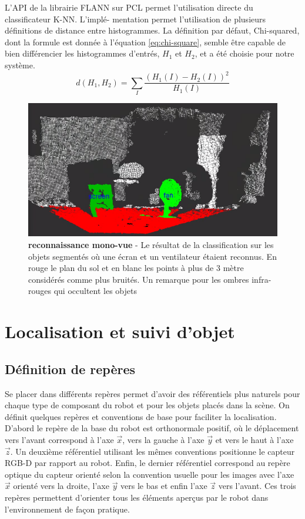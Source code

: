 L'API de la librairie FLANN sur PCL permet l'utilisation directe du classificateur K-NN. L'implé- mentation permet l'utilisation de plusieurs définitions de distance entre histogrammes. La définition par défaut, Chi-squared, dont la formule est donnée à l'équation \ref{eq:chi-square}, semble être capable de bien différencier les histogrammes d'entrés, $H_1$ et $H_2$, et a été choisie pour notre système.
\begin{equation}
d(H_1, H_2) = \sum _I \frac{\left(H_1(I)-H_2(I)\right)^2}{H_1(I)}
\label{eq:chi-square}
\end{equation}

\begin{figure}[H]
	\includegraphics[width=\textwidth]{mono_recon.png}
	\caption{\textbf{reconnaissance mono-vue} - Le résultat de la classification sur les objets segmentés où une écran et un ventilateur étaient reconnus. En rouge le plan du sol et en blanc les points à plus de 3 mètre considérés comme plus bruités. Un remarque pour les ombres infra-rouges qui occultent les objets}
	\label{fig:mono_recon}   
\end{figure}

\section{Localisation et suivi d'objet}

\subsection{Définition de repères}

Se placer dans différents repères permet d'avoir des référentiels plus naturels pour chaque type de composant du robot et pour les objets placés dans la scène. On définit quelques repères et conventions de base pour faciliter la localisation. D'abord le repère de la base du robot est orthonormale positif, où le déplacement vers l'avant correspond à l'axe $\vec{x}$, vers la gauche à l'axe $\vec{y}$ et vers le haut à l'axe $\vec{z}$. Un deuxième référentiel utilisant les mêmes conventions positionne le capteur RGB-D par rapport au robot. Enfin, le dernier référentiel correspond au repère optique du capteur orienté selon la convention usuelle pour les images avec l'axe $\vec{x}$ orienté vers la droite, l'axe $\vec{y}$ vers le bas et enfin l'axe $\vec{z}$ vers l'avant. Ces trois repères permettent d'orienter tous les éléments aperçus par le robot dans l'environnement de façon pratique.

